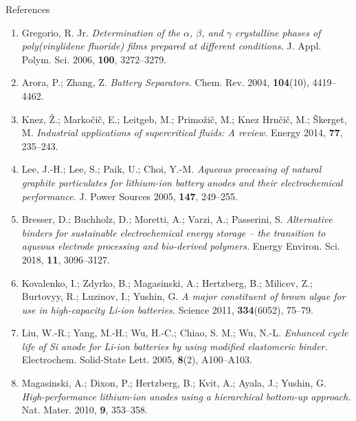 \documentclass[aspectratio=169]{beamer}
\begin{document}
\begin{frame}[allowframebreaks]{References}
    \footnotesize
    \begin{enumerate}
        \item Gregorio, R. Jr. \textit{Determination of the $\alpha$, $\beta$, and $\gamma$ crystalline phases of poly(vinylidene fluoride) films prepared at different conditions.} J. Appl. Polym. Sci. 2006, \textbf{100}, 3272–3279.
        
        \item Arora, P.; Zhang, Z. \textit{Battery Separators.} Chem. Rev. 2004, \textbf{104}(10), 4419–4462.
        
        \item Knez, Ž.; Markočič, E.; Leitgeb, M.; Primožič, M.; Knez Hrnčič, M.; Škerget, M. \textit{Industrial applications of supercritical fluids: A review.} Energy 2014, \textbf{77}, 235–243.
        
        \item Lee, J.-H.; Lee, S.; Paik, U.; Choi, Y.-M. \textit{Aqueous processing of natural graphite particulates for lithium-ion battery anodes and their electrochemical performance.} J. Power Sources 2005, \textbf{147}, 249–255.
        
        \item Bresser, D.; Buchholz, D.; Moretti, A.; Varzi, A.; Passerini, S. \textit{Alternative binders for sustainable electrochemical energy storage – the transition to aqueous electrode processing and bio-derived polymers.} Energy Environ. Sci. 2018, \textbf{11}, 3096–3127.
        
        \item Kovalenko, I.; Zdyrko, B.; Magasinski, A.; Hertzberg, B.; Milicev, Z.; Burtovyy, R.; Luzinov, I.; Yushin, G. \textit{A major constituent of brown algae for use in high-capacity Li-ion batteries.} Science 2011, \textbf{334}(6052), 75–79.
        
        \item Liu, W.-R.; Yang, M.-H.; Wu, H.-C.; Chiao, S. M.; Wu, N.-L. \textit{Enhanced cycle life of Si anode for Li-ion batteries by using modified elastomeric binder.} Electrochem. Solid-State Lett. 2005, \textbf{8}(2), A100–A103.
        
        \item Magasinski, A.; Dixon, P.; Hertzberg, B.; Kvit, A.; Ayala, J.; Yushin, G. \textit{High-performance lithium-ion anodes using a hierarchical bottom-up approach.} Nat. Mater. 2010, \textbf{9}, 353–358.
        

\end{enumerate}
\end{frame}
\end{document}
